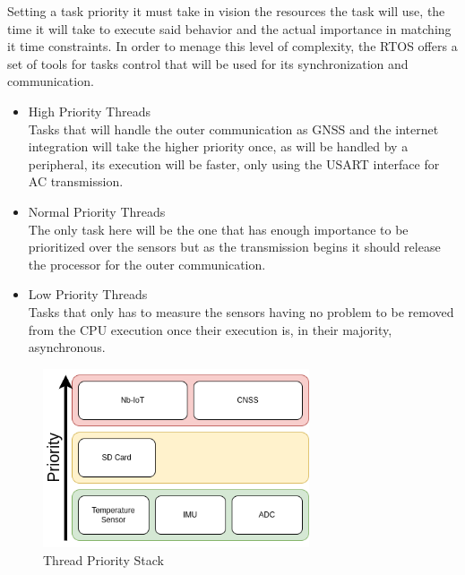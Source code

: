 Setting a task priority it must take in vision the resources the task will use, the time it will take to execute said behavior
and the actual importance in matching it time constraints. In order to menage this level of complexity, the RTOS offers a set of
tools for tasks control that will be used for its synchronization and communication.
\begin{itemize}
    \item High Priority Threads \\ 
    Tasks that will handle the outer communication as GNSS and the internet integration will take the higher priority once, as will be handled
    by a peripheral, its execution will be faster, only using the USART interface for AC transmission. 
    \item Normal Priority Threads \\
    The only task here will be the one that has enough importance to be prioritized over the sensors but as the transmission begins it should release the processor
    for the outer communication.
    \item Low Priority Threads \\
    Tasks that only has to measure the sensors having no problem to be removed from the CPU execution
    once their execution is, in their majority, asynchronous.
    
\end{itemize}

\begin{figure}[H]
    \centering
    \includegraphics[width=0.7\textwidth]{images/diagrams/threads/thread.drawio.png}  %
    \caption{Thread Priority Stack}
    \label{fig:Thread Priority Stack}        
\end{figure}

